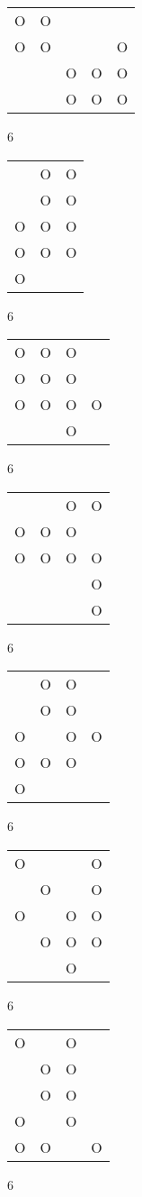 \begin{tabular}{|m{0.2cm}m{0.2cm}m{0.2cm}m{0.2cm}m{0.2cm}|}\hline
O&O& & & \\
O&O& & &O\\
 & &O&O&O\\
 & &O&O&O\\
\hline\end{tabular}6
\begin{tabular}{|m{0.2cm}m{0.2cm}m{0.2cm}|}\hline
 &O&O\\
 &O&O\\
O&O&O\\
O&O&O\\
O& & \\
\hline\end{tabular}6
\begin{tabular}{|m{0.2cm}m{0.2cm}m{0.2cm}m{0.2cm}|}\hline
O&O&O& \\
O&O&O& \\
O&O&O&O\\
 & &O& \\
\hline\end{tabular}6
\begin{tabular}{|m{0.2cm}m{0.2cm}m{0.2cm}m{0.2cm}|}\hline
 & &O&O\\
O&O&O& \\
O&O&O&O\\
 & & &O\\
 & & &O\\
\hline\end{tabular}6
\begin{tabular}{|m{0.2cm}m{0.2cm}m{0.2cm}m{0.2cm}|}\hline
 &O&O& \\
 &O&O& \\
O& &O&O\\
O&O&O& \\
O& & & \\
\hline\end{tabular}6
\begin{tabular}{|m{0.2cm}m{0.2cm}m{0.2cm}m{0.2cm}|}\hline
O& & &O\\
 &O& &O\\
O& &O&O\\
 &O&O&O\\
 & &O& \\
\hline\end{tabular}6
\begin{tabular}{|m{0.2cm}m{0.2cm}m{0.2cm}m{0.2cm}|}\hline
O& &O& \\
 &O&O& \\
 &O&O& \\
O& &O& \\
O&O& &O\\
\hline\end{tabular}6

